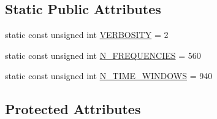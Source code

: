 \subsection*{Static Public Attributes}
\begin{DoxyCompactItemize}
\item 
static const unsigned int \hyperlink{classAudioInput_aff0f7df20d558ba13f85b3d49b7f42b2}{V\+E\+R\+B\+O\+S\+I\+TY} = 2
\item 
static const unsigned int \hyperlink{classAudioInput_a4be6c19fca6626b2ccee1eeca458f7c8}{N\+\_\+\+F\+R\+E\+Q\+U\+E\+N\+C\+I\+ES} = 560
\item 
static const unsigned int \hyperlink{classAudioInput_a8b6b39b0558d7db54234f1e39a38a775}{N\+\_\+\+T\+I\+M\+E\+\_\+\+W\+I\+N\+D\+O\+WS} = 940
\end{DoxyCompactItemize}
\subsection*{Protected Attributes}
